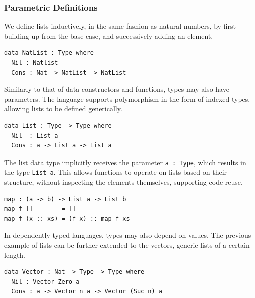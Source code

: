 \documentclass[a4paper]{article}
\begin{document}
\subsubsection{Parametric Definitions}
\label{sec:org62c4f95}

We define lists inductively, in the same fashion as natural numbers, by
first building up from the base case, and successively adding an element.

\begin{center}
\begin{verbatim}
data NatList : Type where
  Nil : Natlist
  Cons : Nat -> NatList -> NatList 
\end{verbatim}
\end{center}

Similarly to that of data constructors and functions, types may 
also have parameters. The language supports polymorphism in the form of
indexed types, allowing lists to be defined generically. 

\begin{center}
\begin{verbatim}
data List : Type -> Type where
  Nil  : List a
  Cons : a -> List a -> List a
\end{verbatim}
\end{center}

The list data type implicitly receives the parameter \texttt{a : Type}, which 
results in the type \texttt{List a}. This allows functions to operate on lists
based on their structure, without inspecting the elements themselves,
supporting code reuse. 

\begin{center}
\begin{verbatim}
map : (a -> b) -> List a -> List b
map f []        = []
map f (x :: xs) = (f x) :: map f xs
\end{verbatim}
\end{center}

In dependently typed languages, types may also depend on values.
The previous example of lists can be further extended to the vectors,
generic lists of a certain length. 

\begin{center}
\begin{verbatim}
data Vector : Nat -> Type -> Type where
  Nil : Vector Zero a
  Cons : a -> Vector n a -> Vector (Suc n) a
\end{verbatim}
\end{center}
\end{document}

